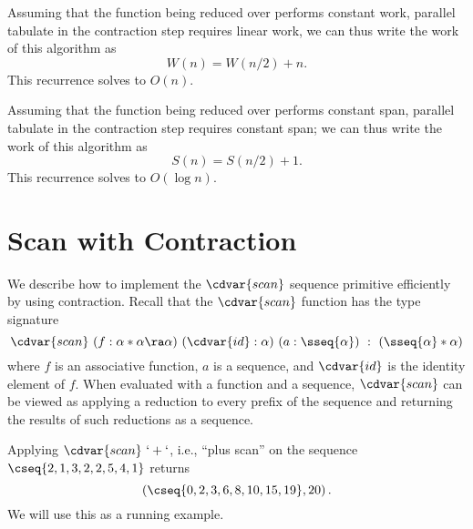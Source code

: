 \begin{cluster}
\label{grp:grm:design::contraction::cost-of-reduce-with-contraction}

\begin{gram}
\label{grm:design::contraction::cost-of-reduce-with-contraction}
Assuming that the function being reduced over performs constant work, 
parallel tabulate in the contraction step requires linear work, 
we can thus write the work of this algorithm as 
\[
W(n) = W(n/2) + n.
\]
This recurrence solves to $O(n)$.


Assuming that the function being reduced over performs constant span, 
parallel tabulate in the contraction step requires constant span;
we can thus write the work of this algorithm as
\[
S(n) = S(n/2) + 1.
\]
This recurrence solves to $O(\log{n})$.

\end{gram}
\end{cluster}


\section{Scan with Contraction}
\label{sec:design::contraction::scan}

\begin{cluster}
\label{grp:grm:design::contraction::describe}

\begin{gram}
\label{grm:design::contraction::describe}
We describe how to implement the $\cdvar{scan}$ sequence primitive
efficiently by using contraction.
Recall that 
the $\cdvar{scan}$ function has the type signature
\[
\cdvar{scan}~(f: \alpha * \alpha \ra \alpha)~(\cdvar{id}: \alpha)~(a: \sseq{\alpha})~:~(\sseq{\alpha} * \alpha)
\]
where $f$ is an associative function, $a$ is a sequence, and
$\cdvar{id}$ is the identity element of $f$.
When evaluated with a function and a sequence, $\cdvar{scan}$ can be
viewed as applying a reduction to every prefix of the sequence and
returning the results of such reductions as a sequence.

\end{gram}
\end{cluster}

\begin{cluster}
\label{grp:xmpl:design::contraction::applying}

\begin{example}
\label{xmpl:design::contraction::applying}
Applying $\cdvar{scan}~`+`$, i.e., ``plus scan'' on the sequence
$\cseq{2,1,3,2,2,5,4,1}$ returns
\[
\left(\cseq{0, 2, 3, 6, 8, 10, 15, 19}, 20\right).
\]
We will use this as a running example.

\end{example}
\end{cluster}

